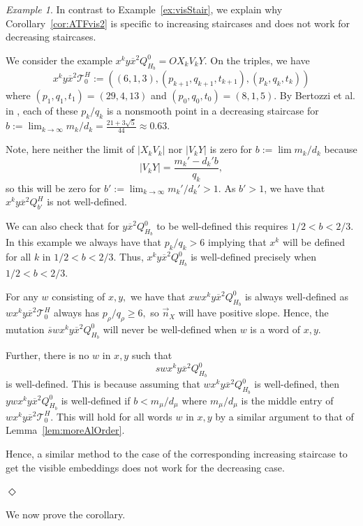 \documentclass[11pt, reqno]{amsart}
\theoremstyle{remark}
\numberwithin{equation}{subsection}
\numberwithin{figure}{section}
\theoremstyle{customremark}
\newtheorem{example_no_diamond}[thm]{Example}
\newenvironment{example}{\begin{example_no_diamond} } {\hfill$\er$ \end{example_no_diamond}}
\newcommand{\Tt}{\mathcal{T}}
\newcommand{\vn}{{\vec{n}}}
\newcommand{\ov}{\overline}
\newcommand{\er}{{\Diamond}}
\begin{document}
\begin{example}
    In contrast to Example~\ref{ex:visStair}, we explain why Corollary~\ref{cor:ATFvis2} is specific to increasing staircases and does not work for decreasing staircases. 

 We consider the example $x^ky\ov{x}^2Q_{H_b}^0=OX_kV_kY.$ On the triples, we have
   \[ x^ky\ov{x}^2\Tt_0^H:=((6,1,3),(p_{k+1},q_{k+1},t_{k+1}),(p_{k},q_{k},t_{k}))\]
   where $(p_1,q_1,t_1)=(29,4,13)$ and $(p_0,q_0,t_0)=(8,1,5).$
   By Bertozzi et al. in \cite{ICERM}, each of these $p_k/q_k$ is a nonsmooth point in a decreasing staircase for $b:=\lim_{k \to \infty} m_k/d_k=\frac{21 + 3\sqrt{5}}{44}\approx 0.63.$
   
   Note, here neither the limit of $|X_kV_k|$ nor $|V_kY|$ is zero for $b:=\lim m_k/d_k$ because 
   \[ |V_kY|=\frac{m_k'-d_k'b}{q_k},\] so this will be zero for $b':=\lim_{k \to \infty} m_k'/d_k'>1$. As $b'>1$, we have that $x^ky\ov{x}^2Q_{b'}^H$ is not well-defined. 


  We can also check that for $y\ov{x}^2Q_{H_b}^0$ to be well-defined this requires $1/2<b<2/3$. In this example we always have that $p_k/q_k>6$ implying that $x^k$ will be defined for all $k$ in $1/2<b<2/3.$ Thus, 
   $x^ky\ov{x}^2Q_{H_b}^0$ is well-defined precisely when $1/2<b<2/3.$ 

For any $w$ consisting of $x,y,$ we have that $xwx^ky\ov{x}^2Q_{H_b}^0$ is always well-defined as $wx^ky\ov{x}^2\Tt_0^H$ always has $p_\rho/q_\rho \geq 6,$ so $\vn_X$ will have positive slope. Hence, the mutation $\ov{s}wx^ky\ov{x}^2Q_{H_b}^0$ will never be well-defined when $w$ is a word of $x,y.$

Further, there is no $w$ in $x,y$ such that 
\[ swx^ky\ov{x}^2Q_{H_b}^0\] 
is well-defined. This is because assuming that  $wx^ky\ov{x}^2Q_{H_b}^0$ is well-defined, then $ywx^ky\ov{x}^2Q_{H_b}^0$ is well-defined if $b<m_\mu/d_\mu$ where $m_\mu/d_\mu$ is the middle entry of $wx^ky\ov{x}^2\Tt_0^H$. This will hold for all words $w$ in $x,y$ by a similar argument to that of Lemma~\ref{lem:moreAlOrder}. 

Hence, a similar method to the case of the corresponding increasing staircase to get the visible embeddings does not work for the decreasing case. 




\end{example}

We now prove the corollary. 
\end{document}
